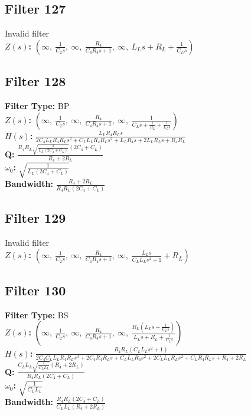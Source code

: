\documentclass{article}
\begin{document}
\subsection*{Filter 127}
Invalid filter \\ 
\textbf{$Z(s)$:} $\left( \infty, \  \frac{1}{C_{2} s}, \  \infty, \  \frac{R_{4}}{C_{4} R_{4} s + 1}, \  \infty, \  L_{L} s + R_{L} + \frac{1}{C_{L} s}\right)$ \\ 
\subsection*{Filter 128}
\textbf{Filter Type:} BP \\ 
\textbf{$Z(s)$:} $\left( \infty, \  \frac{1}{C_{2} s}, \  \infty, \  \frac{R_{4}}{C_{4} R_{4} s + 1}, \  \infty, \  \frac{1}{C_{L} s + \frac{1}{R_{L}} + \frac{1}{L_{L} s}}\right)$ \\ 
\textbf{$H(s)$:} $\frac{L_{L} R_{4} R_{L} s}{2 C_{4} L_{L} R_{4} R_{L} s^{2} + C_{L} L_{L} R_{4} R_{L} s^{2} + L_{L} R_{4} s + 2 L_{L} R_{L} s + R_{4} R_{L}}$ \\ 
\textbf{Q:} $\frac{R_{4} R_{L} \sqrt{\frac{1}{L_{L} \left(2 C_{4} + C_{L}\right)}} \left(2 C_{4} + C_{L}\right)}{R_{4} + 2 R_{L}}$ \\ 
\textbf{$\omega_0$:} $\sqrt{\frac{1}{L_{L} \left(2 C_{4} + C_{L}\right)}}$ \\ 
\textbf{Bandwidth:} $\frac{R_{4} + 2 R_{L}}{R_{4} R_{L} \left(2 C_{4} + C_{L}\right)}$ \\ 
\subsection*{Filter 129}
Invalid filter \\ 
\textbf{$Z(s)$:} $\left( \infty, \  \frac{1}{C_{2} s}, \  \infty, \  \frac{R_{4}}{C_{4} R_{4} s + 1}, \  \infty, \  \frac{L_{L} s}{C_{L} L_{L} s^{2} + 1} + R_{L}\right)$ \\ 
\subsection*{Filter 130}
\textbf{Filter Type:} BS \\ 
\textbf{$Z(s)$:} $\left( \infty, \  \frac{1}{C_{2} s}, \  \infty, \  \frac{R_{4}}{C_{4} R_{4} s + 1}, \  \infty, \  \frac{R_{L} \left(L_{L} s + \frac{1}{C_{L} s}\right)}{L_{L} s + R_{L} + \frac{1}{C_{L} s}}\right)$ \\ 
\textbf{$H(s)$:} $\frac{R_{4} R_{L} \left(C_{L} L_{L} s^{2} + 1\right)}{2 C_{4} C_{L} L_{L} R_{4} R_{L} s^{3} + 2 C_{4} R_{4} R_{L} s + C_{L} L_{L} R_{4} s^{2} + 2 C_{L} L_{L} R_{L} s^{2} + C_{L} R_{4} R_{L} s + R_{4} + 2 R_{L}}$ \\ 
\textbf{Q:} $\frac{C_{L} L_{L} \sqrt{\frac{1}{C_{L} L_{L}}} \left(R_{4} + 2 R_{L}\right)}{R_{4} R_{L} \left(2 C_{4} + C_{L}\right)}$ \\ 
\textbf{$\omega_0$:} $\sqrt{\frac{1}{C_{L} L_{L}}}$ \\ 
\textbf{Bandwidth:} $\frac{R_{4} R_{L} \left(2 C_{4} + C_{L}\right)}{C_{L} L_{L} \left(R_{4} + 2 R_{L}\right)}$ \\ 
\end{document}
